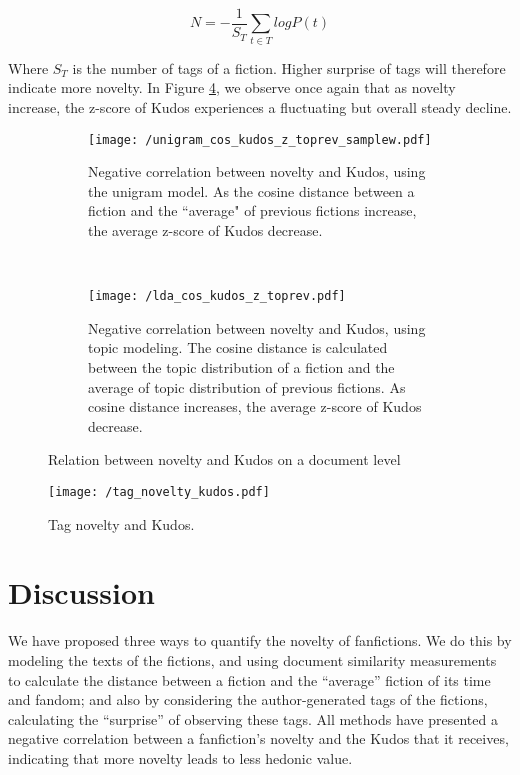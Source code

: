 \documentclass[a4paper]{article}
\begin{document}
\begin{equation}
N = -\frac{1}{S_T}\sum_{t \in{T}} logP(t)
\end{equation}

Where $S_T$ is the number of tags of a fiction. Higher surprise of tags will therefore indicate more novelty. In Figure \ref{fig:tag_novelty}, we observe once again that as novelty increase, the z-score of Kudos experiences a fluctuating but overall steady decline.


\begin{figure}
    \centering
    \begin{subfigure}[b]{0.7\textwidth}
        \texttt{[image: /unigram\_cos\_kudos\_z\_toprev\_samplew.pdf]}
        \caption{Negative correlation between novelty and Kudos, using the unigram model. As the cosine distance between a fiction and the ``average" of previous fictions increase, the average z-score of Kudos decrease.}
        \label{fig:unigram_cos}
    \end{subfigure}
    ~ %
    \begin{subfigure}[b]{0.7\textwidth}
        \texttt{[image: /lda\_cos\_kudos\_z\_toprev.pdf]}
        \caption{Negative correlation between novelty and Kudos, using topic modeling. The cosine distance is calculated between the topic distribution of a fiction and the average of topic distribution of previous fictions. As cosine distance increases, the average z-score of Kudos decrease.}
        \label{fig:lda_cos}
    \end{subfigure}
    \caption{Relation between novelty and Kudos on a document level}\label{fig:novelty_kudos_doc}
\end{figure}

\begin{figure}[htbp]
\begin{center}
\texttt{[image: /tag\_novelty\_kudos.pdf]}
\caption{Tag novelty and Kudos. }
\label{fig:tag_novelty}
\end{center}
\end{figure}

\section*{Discussion}
We have proposed three ways to quantify the novelty of fanfictions. We do this by modeling the texts of the fictions, and using document similarity measurements to calculate the distance between a fiction and the ``average'' fiction of its time and fandom; and also by considering the author-generated tags of the fictions, calculating the ``surprise'' of observing these tags. All methods have presented a negative correlation between a fanfiction's novelty and the Kudos that it receives, indicating that more novelty leads to less hedonic value.
\end{document}
